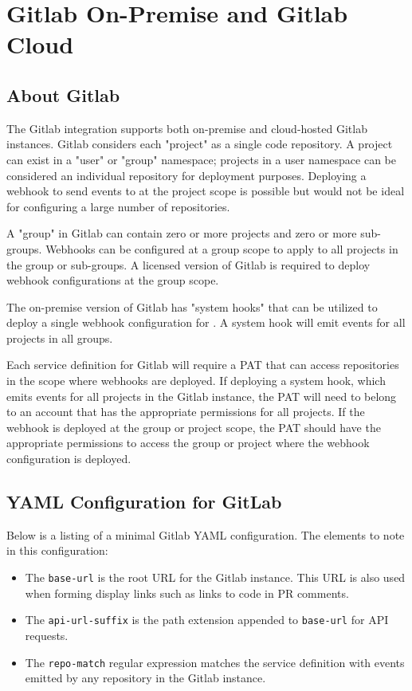 \chapter{Gitlab On-Premise and Gitlab Cloud}


\section{About Gitlab}

The Gitlab integration supports both on-premise and cloud-hosted Gitlab instances.  Gitlab
considers each "project" as a single code repository.  A project can exist in a "user" or "group"
namespace; projects in a user namespace can be considered an individual repository for \cxoneflow
deployment purposes.  Deploying a webhook to send events to \cxoneflow at the project scope
is possible but would not be ideal for configuring a large number of repositories.

A "group" in Gitlab can contain zero or more projects and zero or more sub-groups. Webhooks
can be configured at a group scope to apply to all projects in the group or sub-groups.  A
licensed version of Gitlab is required to deploy webhook configurations at the group scope.

The on-premise version of Gitlab has "system hooks" that can be utilized to deploy
a single webhook configuration for \cxoneflow.  A system hook will emit events for
all projects in all groups.

Each \cxoneflow service definition for Gitlab will require a PAT that can access repositories
in the scope where webhooks are deployed.  If deploying a system hook, which emits events
for all projects in the Gitlab instance, the PAT will need to belong to an account
that has the appropriate permissions for all projects.  If the webhook is deployed
at the group or project scope, the PAT should have the appropriate permissions
to access the group or project where the webhook configuration is deployed.


\section{\cxoneflowtext\space YAML Configuration for GitLab}

Below is a listing of a minimal Gitlab YAML configuration.  The elements to note in this
configuration:

\begin{itemize}
    \item The \texttt{base-url} is the root URL for the Gitlab instance.  This URL is also used
    when forming display links such as links to code in PR comments.
    \item The \texttt{api-url-suffix} is the path extension appended to \texttt{base-url} for API requests.
    \item The \texttt{repo-match} regular expression matches the service definition with events emitted by any repository
    in the Gitlab instance.
\end{itemize}

